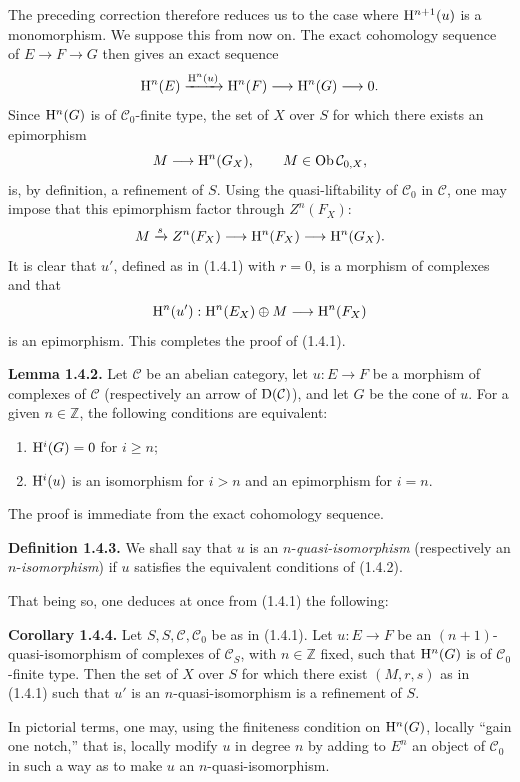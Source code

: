 \documentclass[11pt]{article}
\begin{document}
The preceding correction therefore reduces us to the case where \(\mathrm H^{n+1}(u)\) is a monomorphism. We suppose this from now on. The exact cohomology sequence of \(E\to F\to G\) then gives an exact sequence
\[
  \mathrm H^n(E)\xrightarrow{\mathrm H^n(u)}
  \mathrm H^n(F)\longrightarrow \mathrm H^n(G)\longrightarrow 0.
\]
Since \(\mathrm H^n(G)\) is of \(\mathcal C_0\)-finite type, the set of \(X\) over \(S\) for which there exists an epimorphism
\[
  M\longrightarrow \mathrm H^n(G_X),\qquad M\in\operatorname{Ob}\mathcal C_{0,X},
\]
is, by definition, a refinement of \(S\). Using the quasi-liftability of \(\mathcal C_0\) in \(\mathcal C\), one may impose that this epimorphism factor through \(Z^n(F_X)\):
\[
  M\xrightarrow{s}Z^n(F_X)\longrightarrow \mathrm H^n(F_X)\longrightarrow \mathrm H^n(G_X).
\]
It is clear that \(u'\), defined as in (1.4.1) with \(r=0\), is a morphism of complexes and that
\[
  \mathrm H^n(u'):\mathrm H^n(E_X)\oplus M\longrightarrow \mathrm H^n(F_X)
\]
is an epimorphism. This completes the proof of (1.4.1).

\textbf{Lemma 1.4.2.} Let \(\mathcal C\) be an abelian category, let \(u:E\to F\) be a morphism of complexes of \(\mathcal C\) (respectively an arrow of \(\mathrm D(\mathcal C)\)), and let \(G\) be the cone of \(u\). For a given \(n\in\mathbb Z\), the following conditions are equivalent:
\begin{enumerate}[label=(\roman*)]
\item \(\mathrm H^i(G)=0\) for \(i\geq n\);
\item \(\mathrm H^i(u)\) is an isomorphism for \(i>n\) and an epimorphism for \(i=n\).
\end{enumerate}
The proof is immediate from the exact cohomology sequence.

\textbf{Definition 1.4.3.} We shall say that \(u\) is an \(n\)-\emph{quasi-isomorphism} (respectively an \(n\)-\emph{isomorphism}) if \(u\) satisfies the equivalent conditions of (1.4.2).

That being so, one deduces at once from (1.4.1) the following:

\textbf{Corollary 1.4.4.} Let \(S,S,\mathcal C,\mathcal C_0\) be as in (1.4.1). Let \(u:E\to F\) be an \((n+1)\)-quasi-isomorphism of complexes of \(\mathcal C_S\), with \(n\in\mathbb Z\) fixed, such that \(\mathrm H^n(G)\) is of \(\mathcal C_0\)-finite type. Then the set of \(X\) over \(S\) for which there exist \((M,r,s)\) as in (1.4.1) such that \(u'\) is an \(n\)-quasi-isomorphism is a refinement of \(S\).

In pictorial terms, one may, using the finiteness condition on \(\mathrm H^n(G)\), locally ``gain one notch,'' that is, locally modify \(u\) in degree \(n\) by adding to \(E^n\) an object of \(\mathcal C_0\) in such a way as to make \(u\) an \(n\)-quasi-isomorphism.
\end{document}
